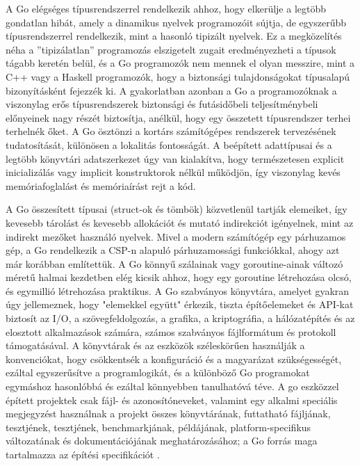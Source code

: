 \newpage

A Go elégséges típusrendszerrel rendelkezik ahhoz, hogy elkerülje a legtöbb gondatlan hibát, amely a dinamikus nyelvek programozóit sújtja, de egyszerűbb típusrendszerrel rendelkezik, mint a hasonló tipizált nyelvek.
Ez a megközelítés néha a ''tipizálatlan'' programozás elszigetelt zugait eredményezheti a típusok tágabb keretén belül, és a Go programozók nem mennek el olyan messzire, mint a C++ vagy a Haskell programozók, hogy a biztonsági tulajdonságokat típusalapú bizonyításként fejezzék ki.
A gyakorlatban azonban a Go a programozóknak a viszonylag erős típusrendszerek biztonsági és futásidőbeli teljesítménybeli előnyeinek nagy részét biztosítja, anélkül, hogy egy összetett típusrendszer terhei terhelnék őket.
A Go ösztönzi a kortárs számítógépes rendszerek tervezésének tudatosítását, különösen a lokalitás fontosságát.
A beépített adattípusai és a legtöbb könyvtári adatszerkezet úgy van kialakítva, hogy természetesen explicit inicializálás vagy implicit konstruktorok nélkül működjön, így viszonylag kevés memóriafoglalást és memóriaírást rejt a kód.

A Go összesített típusai (struct-ok és tömbök) közvetlenül tartják elemeiket, így kevesebb tárolást és kevesebb allokációt és mutató indirekciót igényelnek, mint az indirekt mezőket használó nyelvek.
Mivel a modern számítógép egy párhuzamos gép, a Go rendelkezik a CSP-n alapuló párhuzamossági funkciókkal, ahogy azt már korábban említettük.
A Go könnyű szálainak vagy goroutine-ainak változó méretű halmai kezdetben elég kicsik ahhoz, hogy egy goroutine létrehozása olcsó, és egymillió létrehozása praktikus.
A Go szabványos könyvtára, amelyet gyakran úgy jellemeznek, hogy "elemekkel együtt" érkezik, tiszta építőelemeket és API-kat biztosít az I/O, a szövegfeldolgozás, a grafika, a kriptográfia, a hálózatépítés és az elosztott alkalmazások számára, számos szabványos fájlformátum és protokoll támogatásával.
A könyvtárak és az eszközök széleskörűen használják a konvenciókat, hogy csökkentsék a konfiguráció és a magyarázat szükségességét, ezáltal egyszerűsítve a programlogikát, és a különböző Go programokat egymáshoz hasonlóbbá és ezáltal könnyebben tanulhatóvá téve.
A go eszközzel épített projektek csak fájl- és azonosítóneveket, valamint egy alkalmi speciális megjegyzést használnak a projekt összes könyvtárának, futtatható fájljának, tesztjének, tesztjének, benchmarkjának, példájának, platform-specifikus változatának és dokumentációjának meghatározásához; a Go forrás maga tartalmazza az építési specifikációt \cite{Alan15}.

